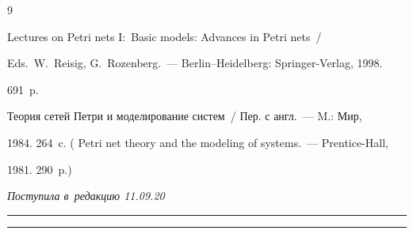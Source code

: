 {{\begin{thebibliography}{9}

 Lectures on Petri nets I:~Basic models: Advances in Petri nets~/

Eds.\  W.~Reisig, G.~Rozenberg.~--- Berlin--Heidelberg: Springer-Verlag, 1998.  

691~p.


 Теория сетей Петри и моделирование систем~/ Пер. с англ.~--- M.: Мир, 

1984. 264~c. ( Petri net theory and the modeling of systems.~--- Prentice-Hall, 

1981. 290~p.) 

\end{thebibliography}

} }





\vspace*{-3pt}



\hfill{\small\textit{Поступила в~редакцию 11.09.20}}









\vspace*{6pt}



\hrule



\vspace*{2pt}









\hrule



\vspace*{8pt}



\def\tit{CONSTRUCTING PROCESS MODELS\\ REPRESENTED BY~SIMPLE PETRI NETS}



\def\titkol{Constructing process models represented by~Simple Petri nets}








